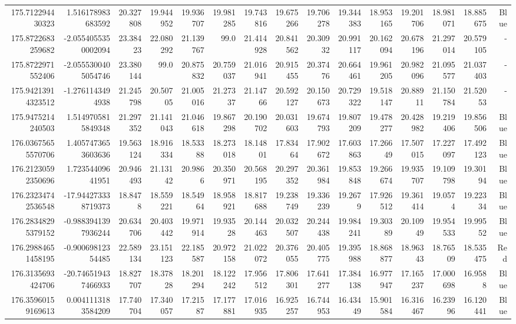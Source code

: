 \begin{center}
\begin{longtable}{rrrrrrrrrrrrrrr}
175.712294430323 & 1.516178983683592 & 20.327808 & 19.944952 & 19.936707 & 19.981285 & 19.743816 & 19.675266 & 19.706278 & 19.344383 & 18.953165 & 19.201706 & 18.981071 & 18.885675 & Blue \\
175.8722683259682 & -2.0554055350002094 & 23.38423 & 22.080292 & 21.139767 & 99.0 & 21.414928 & 20.841562 & 20.30932 & 20.991117 & 20.162094 & 20.678196 & 21.297014 & 20.579105 & - \\
175.8722971552406 & -2.0555300405054746 & 23.380144 & 99.0 & 20.875832 & 20.759037 & 21.016941 & 20.915455 & 20.37476 & 20.664461 & 19.961205 & 20.982096 & 21.095577 & 21.037403 & - \\
175.94213914323512 & -1.2761143494938 & 21.245798 & 20.50705 & 21.005016 & 21.27337 & 21.14766 & 20.592127 & 20.150673 & 20.729322 & 19.518147 & 20.88911 & 21.150784 & 21.52053 & - \\
175.9475214240503 & 1.5149705815849348 & 21.297352 & 21.141043 & 21.046618 & 19.867298 & 20.190702 & 20.031603 & 19.674793 & 19.807209 & 19.478277 & 20.428982 & 19.219406 & 19.856506 & Blue \\
176.03675655570706 & 1.4057473653603636 & 19.563124 & 18.916334 & 18.53388 & 18.273018 & 18.14801 & 17.83464 & 17.902672 & 17.603863 & 17.26649 & 17.507015 & 17.227097 & 17.492123 & Blue \\
176.21230592350696 & 1.72354409641951 & 20.946493 & 21.13142 & 20.9866 & 20.350971 & 20.568195 & 20.297352 & 20.361984 & 19.853848 & 19.266674 & 19.935707 & 19.109798 & 19.30194 & Blue \\
176.23234742536548 & -17.944273338719373 & 18.8478 & 18.559221 & 18.54964 & 18.958921 & 18.817688 & 19.238749 & 19.336239 & 19.2679 & 17.926512 & 19.361414 & 19.0574 & 19.22334 & Blue \\
176.28348295379152 & -0.9883941397936244 & 20.634706 & 20.403442 & 19.971914 & 19.93528 & 20.144463 & 20.032507 & 20.244438 & 19.984241 & 19.30389 & 20.10949 & 19.954533 & 19.99552 & Blue \\
176.29884651458195 & -0.90069812354485 & 22.589134 & 23.151123 & 22.185587 & 20.972158 & 21.022072 & 20.376055 & 20.405775 & 19.395988 & 18.868877 & 18.96343 & 18.76509 & 18.535475 & Red \\
176.3135693424706 & -20.746519437466933 & 18.827707 & 18.37828 & 18.201294 & 18.122242 & 17.956512 & 17.806301 & 17.641277 & 17.384138 & 16.977947 & 17.165237 & 17.000698 & 16.9588 & Blue \\
176.35960159169613 & 0.0041113183584209 & 17.740704 & 17.340057 & 17.21587 & 17.177881 & 17.016935 & 16.925257 & 16.744953 & 16.43449 & 15.901584 & 16.316467 & 16.23996 & 16.120441 & Blue \\

\end{longtable}
\end{center}
